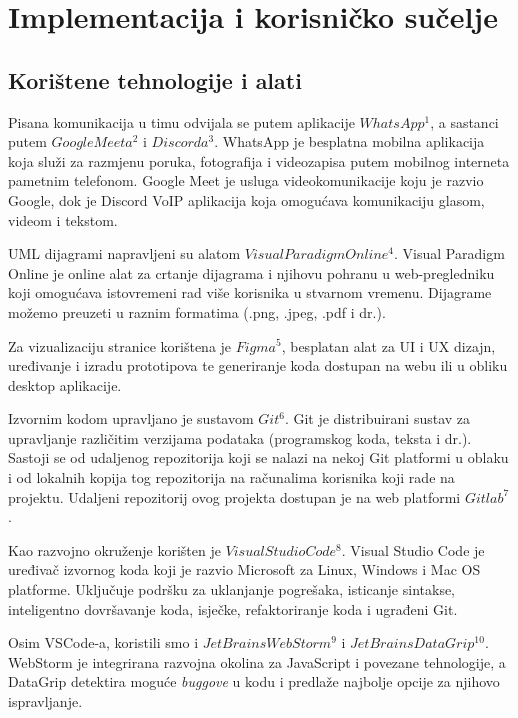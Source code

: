 ﻿\chapter{Implementacija i korisničko sučelje}
		
		
		\section{Korištene tehnologije i alati}
		Pisana komunikacija u timu odvijala se putem aplikacije $WhatsApp^{1}$, a sastanci putem $Google Meeta^{2}$ i $Discorda^{3}$. WhatsApp je besplatna mobilna aplikacija koja služi za razmjenu poruka, fotografija i videozapisa putem mobilnog interneta pametnim telefonom. Google Meet je usluga videokomunikacije koju je razvio Google, dok je Discord VoIP aplikacija koja omogućava komunikaciju glasom, videom i tekstom.
		
		UML dijagrami napravljeni su alatom $Visual Paradigm Online^{4}$. Visual Paradigm Online je online alat za crtanje dijagrama i njihovu pohranu u web-pregledniku koji omogućava istovremeni rad više korisnika u stvarnom vremenu. Dijagrame možemo preuzeti u raznim formatima (.png, .jpeg, .pdf i dr.).
		
		Za vizualizaciju stranice korištena je $Figma^{5}$, besplatan alat za UI i UX dizajn, uređivanje i izradu	prototipova te generiranje koda dostupan na webu ili u obliku desktop aplikacije.
		
		Izvornim kodom upravljano je sustavom $Git^{6}$. Git je distribuirani sustav za upravljanje različitim	verzijama podataka (programskog koda, teksta i dr.). Sastoji se od udaljenog repozitorija koji se nalazi na nekoj Git platformi u oblaku i od lokalnih kopija tog repozitorija na računalima korisnika koji rade na projektu. Udaljeni repozitorij ovog projekta dostupan je na web platformi $Gitlab^{7}$.
		
		Kao razvojno okruženje korišten je $Visual Studio Code^{8}$. Visual Studio Code
		je uređivač izvornog koda koji je razvio Microsoft za Linux, Windows i Mac OS platforme. Uključuje podršku za uklanjanje pogrešaka, isticanje sintakse, inteligentno dovršavanje koda, isječke, refaktoriranje koda i ugrađeni Git.
		
		Osim VSCode-a, koristili smo i $JetBrains WebStorm^{9}$ i $JetBrains DataGrip^{10}$. WebStorm je integrirana razvojna okolina za JavaScript i povezane tehnologije, a DataGrip detektira moguće \textit{buggove} u kodu i predlaže najbolje opcije za njihovo ispravljanje.
		

